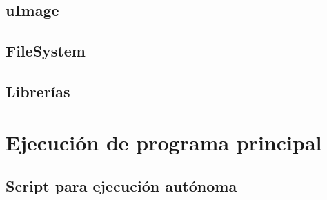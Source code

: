 \subsection{uImage}
\subsection{FileSystem}
\subsection{Librerías}

\section{Ejecución de programa principal}
\subsection{Script para ejecución autónoma}
